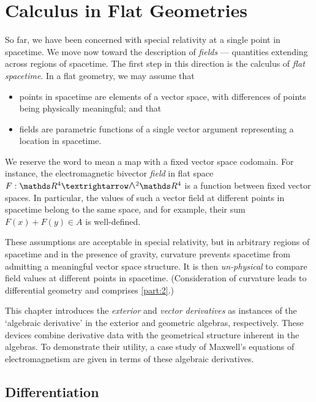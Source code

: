 \chapter{Calculus in Flat Geometries}

So far, we have been concerned with special relativity at a single point in spacetime.
We move now toward the description of \emph{fields} --- quantities extending across regions of spacetime.
The first step in this direction is the calculus of \emph{flat spacetime}.
In a flat geometry, we may assume that
\begin{itemize}
	\item points in spacetime are elements of a vector space, with differences of points being physically meaningful; and that
	\item fields are parametric functions of a single vector argument representing a location in spacetime.
\end{itemize}
We reserve the word  to mean a map with a fixed vector space codomain.
For instance, the electromagnetic bivector \emph{field} in flat space $F : \RR^4 → \EA[2]{\RR^4}$ is a function between fixed vector spaces.
In particular, the values of such a vector field at different points in spacetime belong to the same space, and for example, their sum $F(x) + F(y) ∈ A$ is well-defined.

These assumptions are acceptable in special relativity, but in arbitrary regions of spacetime and in the presence of gravity, curvature prevents spacetime from admitting a meaningful vector space structure.
It is then \emph{un-physical} to compare field values at different points in spacetime.
(Consideration of curvature leads to differential geometry and comprises \cref{part:2}.)

This chapter introduces the \emph{exterior} and \emph{vector derivatives} as instances of the `algebraic derivative' in the exterior and geometric algebras, respectively.
These devices combine derivative data with the geometrical structure inherent in the algebras.
To demonstrate their utility, a case study of Maxwell's equations of electromagnetism are given in terms of these algebraic derivatives.


\section{Differentiation}
\label{sec:algder}

